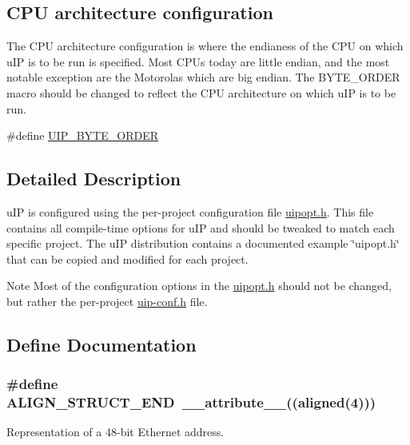 \subsection*{CPU architecture configuration}
\label{_amgrp92204cfdd87c8ee2a9b5b4b68df72ffc}
 The CPU architecture configuration is where the endianess of the CPU on which uIP is to be run is specified. Most CPUs today are little endian, and the most notable exception are the Motorolas which are big endian. The BYTE\_\-ORDER macro should be changed to reflect the CPU architecture on which uIP is to be run. \begin{DoxyCompactItemize}
\item 
\#define \hyperlink{group__uipopt_ga285a80366aed9428f64282b8d13c918b}{UIP\_\-BYTE\_\-ORDER}
\end{DoxyCompactItemize}


\subsection{Detailed Description}
uIP is configured using the per-\/project configuration file \hyperlink{uipopt_8h}{uipopt.h}. This file contains all compile-\/time options for uIP and should be tweaked to match each specific project. The uIP distribution contains a documented example \char`\"{}uipopt.h\char`\"{} that can be copied and modified for each project.

\begin{DoxyNote}{Note}
Most of the configuration options in the \hyperlink{uipopt_8h}{uipopt.h} should not be changed, but rather the per-\/project \hyperlink{uip-conf_8h}{uip-\/conf.h} file. 
\end{DoxyNote}


\subsection{Define Documentation}
\hypertarget{group__uipfw_ga8dbc55e1183365cafdd75d7c18215bb2}{
\subsubsection[{ALIGN\_\-STRUCT\_\-END}]{\setlength{\rightskip}{0pt plus 5cm}\#define {\bf ALIGN\_\-STRUCT\_\-END}~\_\-\_\-attribute\_\-\_\-((aligned(4)))}}
\label{group__uipfw_ga8dbc55e1183365cafdd75d7c18215bb2}
Representation of a 48-\/bit Ethernet address. 

